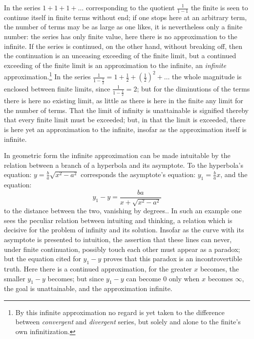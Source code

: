\documentclass[12pt,a4paper,openany]{book}
\newcommand{\opage}[1]{\marginnote{\footnotesize\textit{[#1]}}}
\begin{document}
In the series $1+1+1+\ldots$ corresponding to the quotient $\frac{1}{1-1}$ the finite is seen to continue itself in finite terms without end; if one stops here at an arbitrary term, the number of terms may be as large as one likes, it is nevertheless only a finite number: the series has only finite value, here there is no approximation to the infinite. If the series is continued, on the other hand, without breaking off, then the continuation is an unceasing exceeding of the finite limit, but a continued exceeding of the finite limit is an approximation to the infinite, an \emph{infinite} approximation.\footnote[1]{By this infinite approximation no regard is yet taken to the difference between \textit{convergent} and \textit{divergent} series, but solely and alone to the finite's own infinitization.} In the series $\frac{1}{1-\frac{1}{2}}=1+\frac{1}{2}+\left(\frac{1}{2}\right)^{2}+\ldots$ the whole magnitude is enclosed between finite limits, since $\frac{1}{1-\frac{1}{2}}=2$; but for the diminutions of the terms there is here no existing limit, as little as there is here
\setcounter{footnote}{0}%
\opage{38}in the finite any limit for the number of terms. That the limit of infinity is unattainable is signified thereby that every finite limit must be exceeded; but, in that the limit is exceeded, there is here yet an approximation to the infinite, insofar as the approximation itself is infinite.

In geometric form the infinite approximation can be made intuitable by the relation between a branch of a hyperbola and its asymptote. To the hyperbola's equation: $y=\frac{b}{a}\sqrt{x^{2}-a^{2}}$ corresponds the asymptote's equation: $y_{1}=\frac{b}{a}x$, and the equation: %
\[ y_{1}-y=\frac{ba}{x+\sqrt{x^{2}-a^{2}}} \]
to the distance between the two, vanishing by degrees.. In such an example one sees the peculiar relation between intuiting and thinking, a relation which is decisive for the problem of infinity and its solution. Insofar as the curve with its asymptote %
is presented to intuition, the assertion that these lines can never, under finite continuation, possibly touch each other must appear as a paradox; but the equation cited for $y_{1}-y$ proves that this paradox is an incontrovertible truth. Here there is a continued approximation, for the greater $x$ becomes, the smaller $y_{1}-y$ becomes; but since $y_{1}-y$ can become $0$ only when $x$ becomes $\infty$, the goal is unattainable, and the approximation infinite.
\end{document}
